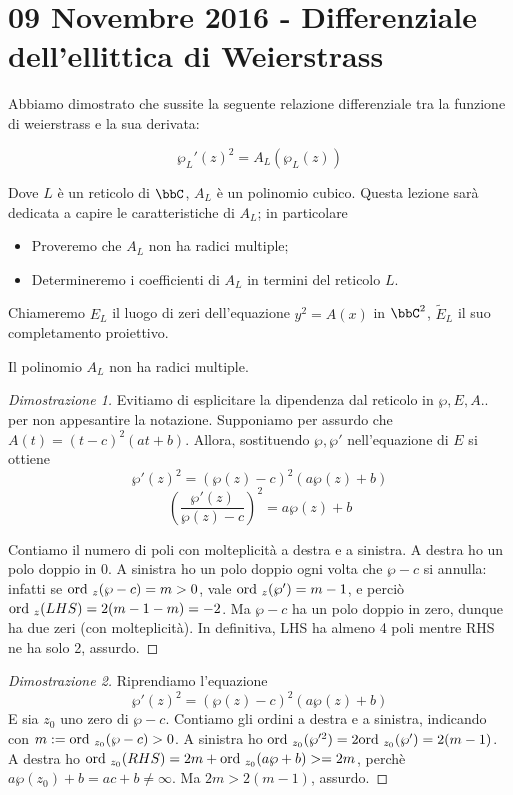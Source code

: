 \chapter{09 Novembre 2016 - Differenziale dell'ellittica di Weierstrass}
Abbiamo dimostrato che sussite la seguente relazione differenziale tra la funzione di weierstrass e la sua derivata:

$$\wp_L'(z)^2 = A_L(\wp_L(z)) $$

Dove $L$ è un reticolo di $\bbC$,  $A_L$ è un polinomio cubico. Questa lezione sarà dedicata a capire le caratteristiche di $A_L$; in particolare
\begin{itemize}
\item Proveremo che $A_L$ non ha radici multiple;
\item Determineremo i coefficienti di $A_L$ in termini del reticolo $L$.
\end{itemize}

Chiameremo $E_L$ il luogo di zeri dell'equazione $y^2=A(x)$ in $\bbC^2$, $\tilde{E}_L$ il suo completamento proiettivo.
\begin{proposizione}
Il polinomio $A_L$ non ha radici multiple.
\end{proposizione}

\begin{proof}[Dimostrazione 1]
Evitiamo di esplicitare la dipendenza dal reticolo in $\wp, E,A..$ per non appesantire la notazione. Supponiamo per assurdo che $A(t) = (t-c)^2(at+b)$. Allora, sostituendo $\wp, \wp'$ nell'equazione di $E$ si ottiene
$$\wp'(z)^2 = (\wp(z) - c)^2(a\wp(z)+b) $$
$$ \left ( \frac{\wp'(z)}{\wp(z)-c} \right )^2 = a\wp(z)+b $$

Contiamo il numero di poli con molteplicità a destra e a sinistra. A destra ho un polo doppio in 0. A sinistra ho un polo doppio ogni volta che $\wp - c$ si annulla: infatti se $\text{ord }_{z}(\wp -c) = m > 0$, vale $\text{ord }_{z}(\wp') = m-1$, e perciò $\text{ord }_{z}(LHS) = 2(m-1-m) = -2$. Ma $\wp-c$ ha un polo doppio in zero, dunque ha due zeri (con molteplicità). In definitiva, LHS ha almeno 4 poli mentre RHS ne ha solo 2, assurdo.
\end{proof}

\begin{proof}[Dimostrazione 2]
Riprendiamo l'equazione 
$$\wp'(z)^2 = (\wp(z) - c)^2(a\wp(z)+b) $$
E sia $z_0$ uno zero di $\wp-c$. Contiamo gli ordini a destra e a sinistra, indicando con $m:=\text{ord }_{z_0}(\wp-c) > 0$. 
A sinistra ho $\text{ord }_{z_0}( \wp'^2) = 2\text{ord }_{z_0}( \wp') = 2(m-1)$. A destra ho $\text{ord }_{z_0}(RHS) = 2m + \text{ord }_{z_0}(a\wp+b) >= 2m$, perchè $a \wp(z_0)+b = ac+b \neq \infty$. Ma $2m> 2(m-1)$, assurdo.
\end{proof}


